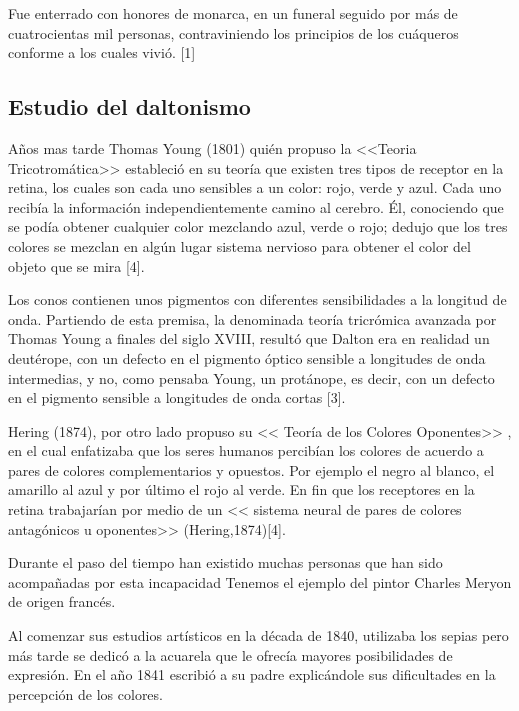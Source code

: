 \documentclass[10pt]{article}
\begin{document}
\setlength{\parskip}{2mm}

Fue enterrado con honores de monarca, en un funeral seguido por más de cuatrocientas mil personas, contraviniendo los principios de los cuáqueros conforme a los cuales vivió. [1]

\subsection{Estudio del daltonismo}

Años mas tarde Thomas Young (1801) quién propuso la <<Teoria Tricotromática>> estableció en su teoría que existen tres tipos de receptor en la retina, los cuales son cada uno sensibles a un color: rojo, verde y azul. Cada uno recibía la información independientemente camino al cerebro. Él, conociendo que se podía obtener cualquier color mezclando azul, verde o rojo; dedujo que los tres colores se mezclan en algún lugar sistema nervioso para obtener el color del objeto que se mira [4].

\setlength{\parskip}{2mm}

Los conos contienen unos pigmentos con diferentes sensibilidades a la longitud de onda. Partiendo de esta premisa, la denominada teoría tricrómica avanzada por Thomas Young a finales del siglo XVIII, resultó que Dalton era en realidad un deutérope, con un defecto en el pigmento óptico sensible a longitudes de onda intermedias, y no, como pensaba Young, un protánope, es decir, con un defecto en el pigmento sensible a longitudes de onda cortas [3].

\setlength{\parskip}{2mm}

Hering (1874), por otro lado propuso su << Teoría de los Colores Oponentes>> , en el cual enfatizaba que los seres humanos percibían los colores de acuerdo a pares de colores complementarios y opuestos. Por ejemplo el negro al blanco, el amarillo al azul y por último el rojo al verde. En fin que los receptores en la retina trabajarían por medio de un << sistema neural de pares de colores antagónicos u oponentes>> (Hering,1874)[4].

\setlength{\parskip}{2mm}

Durante el paso del tiempo han existido muchas personas que han sido acompañadas por esta incapacidad 
Tenemos el ejemplo del pintor Charles Meryon de origen francés.

\setlength{\parskip}{2mm}

Al comenzar sus estudios artísticos en la década de 1840, utilizaba los sepias pero más tarde se dedicó a la acuarela que le ofrecía mayores posibilidades de expresión. En el año 1841 escribió a su padre explicándole sus dificultades en la percepción de los colores.
\end{document}
